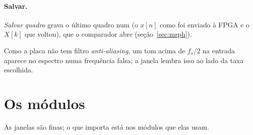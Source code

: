 \paragraph{Salvar.} \emph{Salvar quadro} grava o último quadro num
 (o \(x[n]\) como foi enviado à FPGA e o \(X[k]\) que voltou), que o
comparador abre (seção~\ref{sec:mrph}).

Como a placa não tem filtro \emph{anti-aliasing}, um tom acima de \(f_s/2\) na
entrada aparece no espectro numa frequência falsa; a janela lembra isso ao lado
da taxa escolhida.

\section{Os módulos}

As janelas são finas; o que importa está nos módulos que elas usam.

